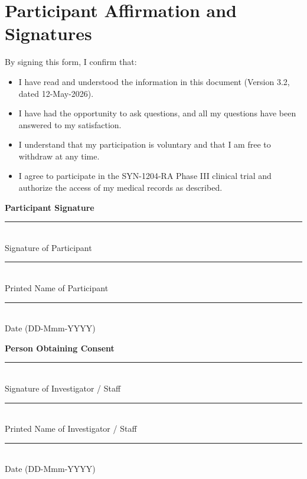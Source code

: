 \section{Participant Affirmation and Signatures}

\begin{tcolorbox}[consentbox, title=Affirmation of Informed Consent]
By signing this form, I confirm that:
\begin{itemize}
    \item I have read and understood the information in this document (Version 3.2, dated 12-May-2026).
    \item I have had the opportunity to ask questions, and all my questions have been answered to my satisfaction.
    \item I understand that my participation is voluntary and that I am free to withdraw at any time.
    \item I agree to participate in the SYN-1204-RA Phase III clinical trial and authorize the access of my medical records as described.
\end{itemize}
\end{tcolorbox}

\vspace{0.4cm}

\noindent
\begin{minipage}[t]{0.45\textwidth}
    \textbf{Participant Signature} \\[1.0cm]
    \rule{\textwidth}{0.5pt} \\
    Signature of Participant \\[0.3cm]
    \rule{\textwidth}{0.5pt} \\
    Printed Name of Participant \\[0.3cm]
    \rule{\textwidth}{0.5pt} \\
    Date (DD-Mmm-YYYY)
\end{minipage}
\hfill
\begin{minipage}[t]{0.45\textwidth}
    \textbf{Person Obtaining Consent} \\[1.0cm]
    \rule{\textwidth}{0.5pt} \\
    Signature of Investigator / Staff \\[0.3cm]
    \rule{\textwidth}{0.5pt} \\
    Printed Name of Investigator / Staff \\[0.3cm]
    \rule{\textwidth}{0.5pt} \\
    Date (DD-Mmm-YYYY)
\end{minipage}

